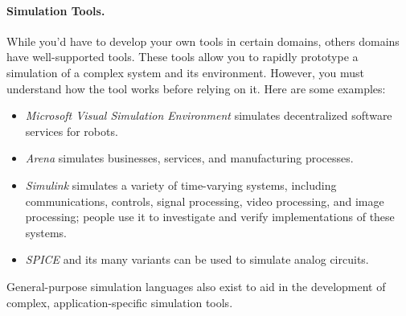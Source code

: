 \paragraph{Simulation Tools.} While you'd have to develop your own tools
in certain domains, others domains have well-supported tools. These
tools allow you to rapidly prototype a simulation of a complex system
and its environment. However, you must understand how the tool works
before relying on it. Here are some examples:

\begin{itemize}
\item \emph{Microsoft Visual Simulation Environment} simulates decentralized software services for robots.
\item \emph{Arena} simulates businesses, services, and manufacturing processes.
\item \emph{Simulink} simulates a variety of time-varying systems, including communications, controls, signal processing, video processing, and image processing; people use it to investigate and verify implementations of these systems.
\item \emph{SPICE} and its many variants can be used to simulate analog circuits.
\end{itemize}

General-purpose simulation languages also exist to aid in the
development of complex, application-specific simulation tools.




